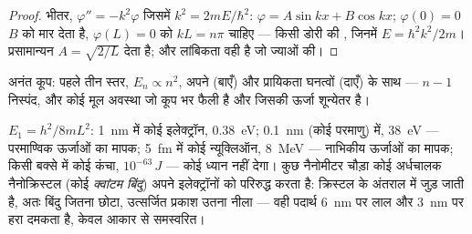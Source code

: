 \begin{proof}
भीतर, $\varphi'' = -k^2\varphi$ जिसमें $k^2 = 2mE/\hbar^2$: $\varphi = A\sin kx
+ B\cos kx$; $\varphi(0) = 0$ $B$ को मार देता है, $\varphi(L) = 0$ को $kL = n\pi$ चाहिए
--- किसी डोरी की , जिनमें $E = \hbar^2k^2/2m$।
प्रसामान्यन $A = \sqrt{2/L}$ देता है; और लांबिकता वही है जो
ज्याओं की।
\end{proof}

\begin{omfigure}

{\small अनंत कूप: पहले तीन स्तर, $E_n \propto n^2$,
अपने  (बाएँ) और प्रायिकता घनत्वों (दाएँ) के साथ ---
$n - 1$ निस्पंद, और कोई मूल अवस्था जो कूप भर फैली है और
जिसकी ऊर्जा शून्येतर है।}
\end{omfigure}

\begin{example}[परिमाण की कोटियाँ, और रंग]\label{ex:b2:potential-wells-tunneling:orders}
$E_1 = h^2/8mL^2$: \qty{1}{nm} में कोई इलेक्ट्रॉन, \qty{0.38}{eV};
\qty{0.1}{nm} (कोई परमाणु) में, \qty{38}{eV} --- परमाण्विक ऊर्जाओं का मापक; \qty{5}{fm}
में कोई न्यूक्लिऑन, \qty{8}{MeV} --- नाभिकीय ऊर्जाओं का मापक; किसी बक्से में
कोई कंचा, $10^{-63}\,\unit{J}$ --- कोई ध्यान नहीं देगा। कुछ नैनोमीटर चौड़ा कोई
अर्धचालक नैनोक्रिस्टल (कोई \emph{क्वांटम
बिंदु}) अपने इलेक्ट्रॉनों को परिरुद्ध करता है: 
क्रिस्टल के अंतराल में जुड़ जाती है, अतः बिंदु जितना छोटा, उत्सर्जित प्रकाश उतना नीला ---
वही पदार्थ \qty{6}{nm} पर लाल और \qty{3}{nm} पर हरा दमकता है,
केवल आकार से समस्वरित।
\end{example}

